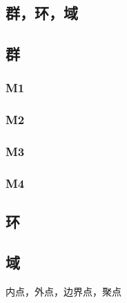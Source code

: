 \begin{center}\section{ 群，环，域}\end{center}
\subsection{群}
\subsubsection{M1}
\subsubsection{M2}
\subsubsection{M3}
\subsubsection{M4}
\subsection{环}
\subsection{域}
内点，外点，边界点，聚点